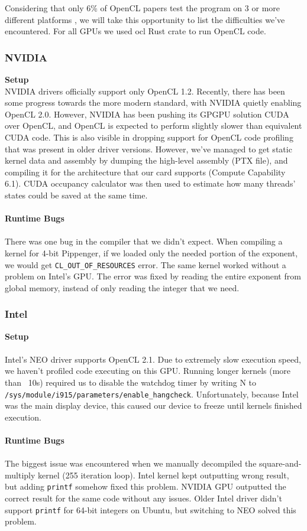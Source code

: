 Considering that only 6\% of OpenCL papers test the program on 3 or more different platforms \cite{sorensen2016hitchhiker}, we will take this opportunity to list the difficulties we've encountered. For all GPUs we used ocl Rust crate to run OpenCL code.

\subsubsection{NVIDIA}
\textbf{Setup}\\
NVIDIA drivers officially support only OpenCL 1.2. Recently, there has been some progress towards the more modern standard, with NVIDIA quietly enabling OpenCL 2.0. However, NVIDIA has been pushing its GPGPU solution CUDA over OpenCL, and OpenCL is expected to perform slightly slower than equivalent CUDA code\cite{fang2011comprehensive, karimi2010performance}. This is also visible in dropping support for OpenCL code profiling that was present in older driver versions. However, we've managed to get static kernel data and assembly by dumping the high-level assembly (PTX file), and compiling it for the architecture that our card supports (Compute Capability 6.1). CUDA occupancy calculator was then used to estimate how many threads' states could be saved at the same time.\\\\
\textbf{Runtime Bugs}\\\\
There was one bug in the compiler that we didn't expect. When compiling a kernel for 4-bit Pippenger, if we loaded only the needed portion of the exponent, we would get \texttt{CL\_OUT\_OF\_RESOURCES} error. The same kernel worked without a problem on Intel's GPU. The error was fixed by reading the entire exponent from global memory, instead of only reading the integer that we need.

\subsubsection{Intel}
\textbf{Setup}\\\\
Intel's NEO driver supports OpenCL 2.1. Due to extremely slow execution speed, we haven't profiled code executing on this GPU. Running longer kernels (more than ~10s) required us to disable the watchdog timer by writing N to \texttt{/sys/module/i915/parameters/enable\_hangcheck}. Unfortunately, because Intel was the main display device, this caused our device to freeze until kernels finished execution.\\\\
\textbf{Runtime Bugs}\\\\
The biggest issue was encountered when we manually decompiled the square-and-multiply kernel (255 iteration loop). Intel kernel kept outputting wrong result, but adding \texttt{printf} somehow fixed this problem. NVIDIA GPU outputted the correct result for the same code without any issues. Older Intel driver didn't support \texttt{printf} for 64-bit integers on Ubuntu, but switching to NEO solved this problem. 

